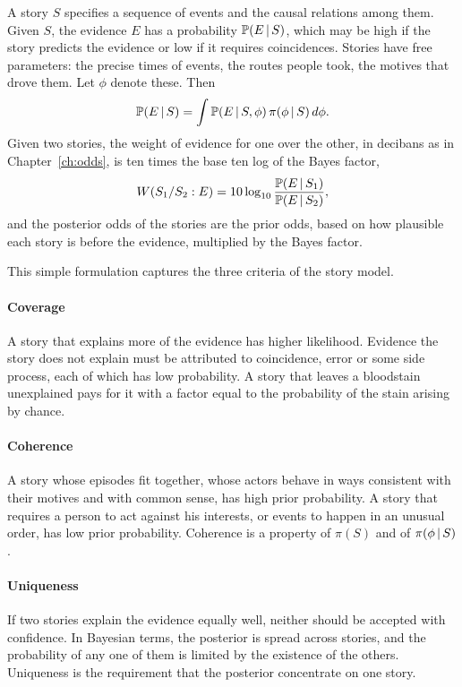 A story $S$ specifies a sequence of events and the causal relations among them. Given $S$, the evidence $E$ has a probability $\mathbb{P}(E\,\vert\, S)$, which may be high if the story predicts the evidence or low if it requires coincidences. Stories have free parameters: the precise times of events, the routes people took, the motives that drove them. Let $\phi$ denote these. Then
\begin{equation}
\mathbb{P}(E\,\vert\, S) = \int \mathbb{P}(E\,\vert\, S, \phi)\,\pi(\phi\,\vert\, S)\,d\phi .
\end{equation}
Given two stories, the weight of evidence for one over the other, in decibans as in Chapter~\ref{ch:odds}, is ten times the base ten log of the Bayes factor,
\begin{equation}
W(S_1/S_2 : E) = 10\log_{10} \frac{\mathbb{P}(E\,\vert\, S_1)}{\mathbb{P}(E\,\vert\, S_2)},
\end{equation}
and the posterior odds of the stories are the prior odds, based on how plausible each story is before the evidence, multiplied by the Bayes factor.

This simple formulation captures the three criteria of the story model.

\paragraph{Coverage} A story that explains more of the evidence has higher likelihood. Evidence the story does not explain must be attributed to coincidence, error or some side process, each of which has low probability. A story that leaves a bloodstain unexplained pays for it with a factor equal to the probability of the stain arising by chance.

\paragraph{Coherence} A story whose episodes fit together, whose actors behave in ways consistent with their motives and with common sense, has high prior probability. A story that requires a person to act against his interests, or events to happen in an unusual order, has low prior probability. Coherence is a property of $\pi(S)$ and of $\pi(\phi\,\vert\, S)$.

\paragraph{Uniqueness} If two stories explain the evidence equally well, neither should be accepted with confidence. In Bayesian terms, the posterior is spread across stories, and the probability of any one of them is limited by the existence of the others. Uniqueness is the requirement that the posterior concentrate on one story.

